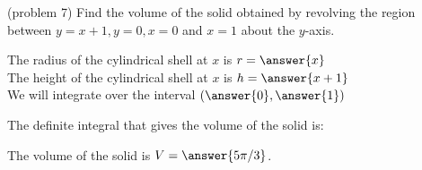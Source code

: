 \documentclass[handout]{ximera}
\begin{document}
\begin{problem}(problem 7)
Find the volume of the solid obtained by revolving the region between $y= x+1, y = 0, x = 0$ and $x = 1$ about the $y$-axis.


The radius of the cylindrical shell at $x$ is $r = \answer{x}$\\
The height of the cylindrical shell at $x$ is $h = \answer{x+1}$\\

We will integrate over the interval $\left(\answer{0},\answer{1}\right)$

The definite integral that gives the volume of the solid is:\\
\begin{multipleChoice}
\end{multipleChoice}

The volume of the solid is $V = \answer{5\pi/3 }$.

\end{problem}
\end{document}
